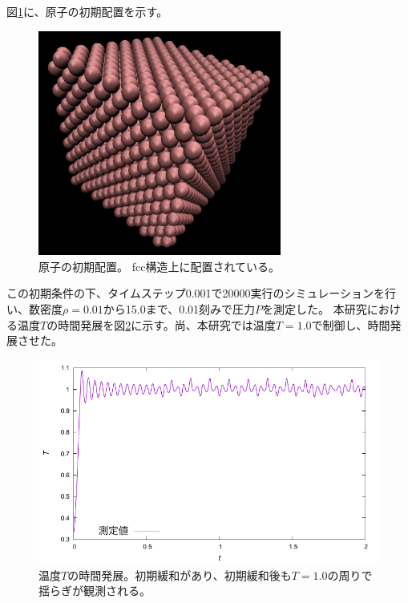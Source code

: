 \documentclass[titlepage]{jsreport}
\begin{document}
{{{\newpage
図\ref{fig:initial-state-molecule}に、原子の初期配置を示す。

\begin{figure}[htbp]
    \begin{center}
        \includegraphics[width=8cm]{fig/initial-state-molecule.png}
    \end{center}
    \caption{原子の初期配置。
    fcc構造上に配置されている。}
    \label{fig:initial-state-molecule}
\end{figure}

この初期条件の下、タイムステップ0.001で20000実行のシミュレーションを行い、数密度$\rho=0.01$から15.0まで、0.01刻みで圧力$P$を測定した。
本研究における温度$T$の時間発展を図\ref{fig:d2.0-tt.pdf}に示す。尚、本研究では温度$T=1.0$で制御し、時間発展させた。

\begin{figure}[htbp]
    \begin{center}
        \includegraphics[width=12cm]{fig/d2.0-tt.pdf}
    \end{center}
    \caption{温度$T$の時間発展。初期緩和があり、初期緩和後も$T=1.0$の周りで揺らぎが観測される。}
    \label{fig:d2.0-tt.pdf}
\end{figure}

}}}
\end{document}
